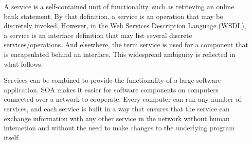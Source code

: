 \documentclass[a4paper]{article}
\begin{document}
A service is a self-contained unit of functionality, such as retrieving an online bank statement. By that definition, a service is an operation
that may be discretely invoked. However, in the Web Services Description Language (WSDL), a service is an interface definition that may list several
discrete services/operations. And elsewhere, the term service is used for a component that is encapsulated behind an interface. This widespread
ambiguity is reflected in what follows.

Services can be combined to provide the functionality of a large software application. SOA makes it easier for software components on computers
connected over a network to cooperate. Every computer can run any number of services, and each service is built in a way that ensures that the service
can exchange information with any other service in the network without human interaction and without the need to make changes to the underlying program
itself.
\end{document}
